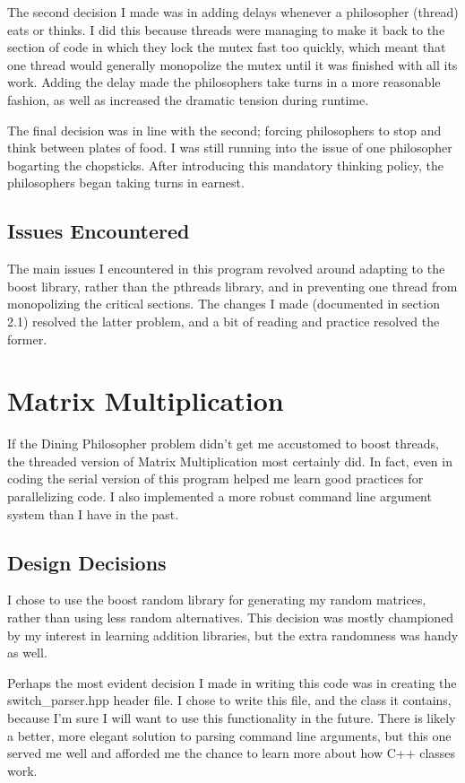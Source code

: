 \documentclass[letterpaper,10pt,titlepage]{article}
\begin{document}
The second decision I made was in adding delays whenever a philosopher (thread) eats
or thinks. I did this because threads were managing to make it back to the section of
code in which they lock the mutex fast too quickly, which meant that one thread would
generally monopolize the mutex until it was finished with all its work. Adding the delay
made the philosophers take turns in a more reasonable fashion, as well as increased the
dramatic tension during runtime.

The final decision was in line with the second; forcing philosophers to stop and think
between plates of food. I was still running into the issue of one philosopher bogarting
the chopsticks. After introducing this mandatory thinking policy, the philosophers
began taking turns in earnest.


\subsection{Issues Encountered}
The main issues I encountered in this program revolved around adapting to the boost
library, rather than the pthreads library, and in preventing one thread from 
monopolizing the critical sections. The changes I made (documented in section 2.1)
resolved the latter problem, and a bit of reading and practice resolved the former.


\vfill\break


\section{Matrix Multiplication}
If the Dining Philosopher problem didn't get me accustomed to boost threads,
the threaded version of Matrix Multiplication most certainly did. In fact,
even in coding the serial version of this program helped me learn good practices
for parallelizing code. I also implemented a more robust command line argument 
system than I have in the past.

\subsection{Design Decisions}
I chose to use the boost random library for generating my random matrices, rather
than using less random alternatives. This decision was mostly championed by my
interest in learning addition libraries, but the extra randomness was handy as well.

Perhaps the most evident decision I made in writing this code was in creating the
switch\_parser.hpp header file. I chose to write this file, and the class it contains,
because I'm sure I will want to use this functionality in the future. There is likely
a better, more elegant solution to parsing command line arguments, but this one served
me well and afforded me the chance to learn more about how C++ classes work.
\end{document}
